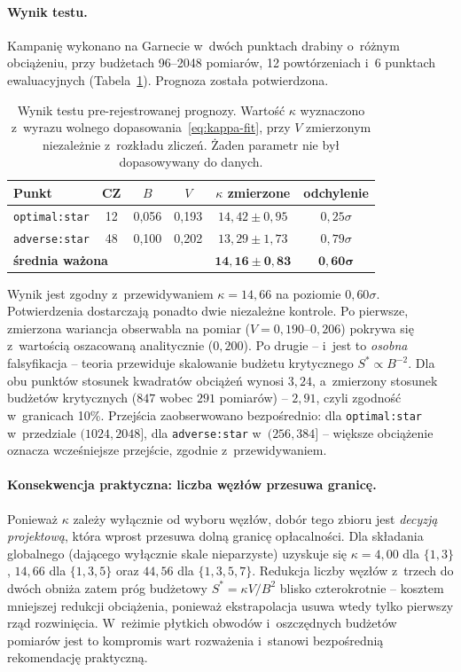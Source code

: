 \documentclass[11pt]{article}
\begin{document}
\paragraph{Wynik testu.} Kampanię wykonano na Garnecie w~dwóch punktach drabiny o~różnym
obciążeniu, przy budżetach 96--2048 pomiarów, 12 powtórzeniach i~6 punktach ewaluacyjnych
(Tabela~\ref{tab:kappa}). Prognoza została potwierdzona.

\begin{table}[!ht]\centering
\caption{Wynik testu pre-rejestrowanej prognozy. Wartość $\kappa$ wyznaczono z~wyrazu wolnego
dopasowania~\eqref{eq:kappa-fit}, przy $V$ zmierzonym niezależnie z~rozkładu zliczeń. Żaden parametr
nie był dopasowywany do danych.}
\label{tab:kappa}
\begin{tabular}{lccccc}
\toprule
Punkt & CZ & $B$ & $V$ & $\kappa$ zmierzone & odchylenie \\
\midrule
\texttt{optimal:star} & 12 & 0{,}056 & 0{,}193 & $14{,}42 \pm 0{,}95$ & $0{,}25\sigma$ \\
\texttt{adverse:star} & 48 & 0{,}100 & 0{,}202 & $13{,}29 \pm 1{,}73$ & $0{,}79\sigma$ \\
\midrule
\multicolumn{4}{l}{\textbf{średnia ważona}} & $\mathbf{14{,}16 \pm 0{,}83}$ & $\mathbf{0{,}60\sigma}$ \\
\bottomrule
\end{tabular}
\end{table}

Wynik jest zgodny z~przewidywaniem $\kappa = 14{,}66$ na poziomie $0{,}60\sigma$. Potwierdzenia
dostarczają ponadto dwie niezależne kontrole. Po pierwsze, zmierzona wariancja obserwabla na pomiar
($V = 0{,}190$--$0{,}206$) pokrywa się z~wartością oszacowaną analitycznie ($0{,}200$). Po drugie --
i~jest to \emph{osobna} falsyfikacja -- teoria przewiduje skalowanie budżetu krytycznego
$S^{*} \propto B^{-2}$. Dla obu punktów stosunek kwadratów obciążeń wynosi $3{,}24$, a~zmierzony
stosunek budżetów krytycznych ($847$ wobec $291$ pomiarów) -- $2{,}91$, czyli zgodność w~granicach
10\%. Przejścia zaobserwowano bezpośrednio: dla \texttt{optimal:star} w~przedziale $(1024, 2048]$,
dla \texttt{adverse:star} w~$(256, 384]$ -- większe obciążenie oznacza wcześniejsze przejście,
zgodnie z~przewidywaniem.

\paragraph{Konsekwencja praktyczna: liczba węzłów przesuwa granicę.} Ponieważ $\kappa$ zależy
wyłącznie od wyboru węzłów, dobór tego zbioru jest \emph{decyzją projektową}, która wprost przesuwa
dolną granicę opłacalności. Dla składania globalnego (dającego wyłącznie skale nieparzyste)
uzyskuje się $\kappa = 4{,}00$ dla $\{1,3\}$, $14{,}66$ dla $\{1,3,5\}$ oraz $44{,}56$ dla
$\{1,3,5,7\}$. Redukcja liczby węzłów z~trzech do dwóch obniża zatem próg budżetowy
$S^{*}=\kappa V/B^2$ blisko czterokrotnie -- kosztem mniejszej redukcji obciążenia, ponieważ
ekstrapolacja usuwa wtedy tylko pierwszy rząd rozwinięcia. W~reżimie płytkich obwodów
i~oszczędnych budżetów pomiarów jest to kompromis wart rozważenia i~stanowi bezpośrednią
rekomendację praktyczną.
\end{document}
